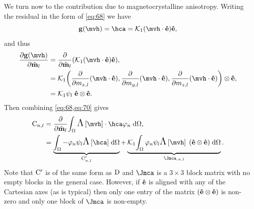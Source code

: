 {We turn now to the contribution due to magnetocrystalline anisotropy.
Writing the residual in the form of \cref{eq:68} we have
\begin{equation}
  \gv(\mvh) = \hca = \kone (\mvh \cdot \ev) \ev,
\end{equation}
and thus
\begin{equation}
  \begin{aligned}
    \pd{\gv(\mvh)}{\mvdis_l} &= \pd{}{\mvdis_l} \bigb{ \kone (\mvh \cdot \ev) \ev}, \\
    &= \kone \bigb{ \pd{}{m_{x,l}} (\mvh \cdot \ev),
      \pd{}{m_{y,l}} (\mvh \cdot \ev),
      \pd{}{m_{z,l}} (\mvh \cdot \ev) }  \tensorprod \ev, \\
    &= \kone \sbf_l \; \ev  \tensorprod \ev.
    \label{eq:70}
  \end{aligned}
\end{equation}
Then combining \cref{eq:68,eq:70} gives
\begin{equation}
  \begin{aligned}
    \Cm_{n,l} &= \pd{}{\mvdis_l} \intd{ \skewm{\mvh} \cdot \hca  \tbf_n}, \\
    &= \underbrace{\intd{ -\tbf_n \sbf_l\skewm{\hca} }}_{\Cm'_{n,l}}
    + \underbrace{\kone \intd{ \tbf_n \sbf_l \skewm{\mvh} \; (\ev  \tensorprod \ev) }}_{\Jmca_{,n,l}}.
    \label{eq:hca-jacobian}
  \end{aligned}
\end{equation}
Note that $\mathrm{C}'$ is of the same form as $\mathrm{D}$ and $\Jmca$ is a $3\times3$ block matrix with no empty blocks in the general case.
However, if $\boldsymbol{\mathrm{\hat{e}}}$ is aligned with any of the Cartesian axes (as is typical) then only one entry of the matrix $(\boldsymbol{\mathrm{\hat{e}}} \otimes \boldsymbol{\mathrm{\hat{e}}})$ is non-zero and only one block of $\Jmca$ is non-empty.

}
